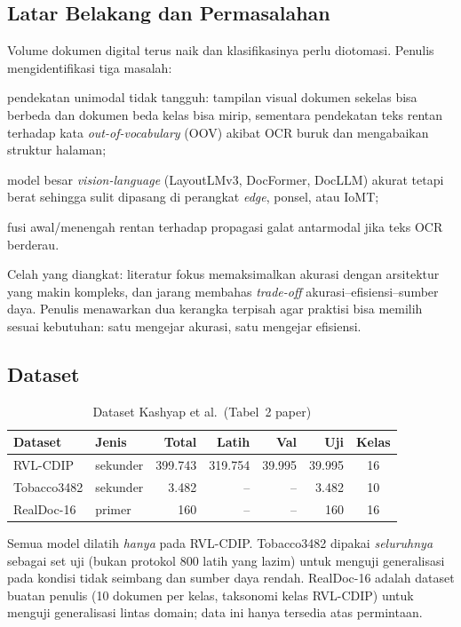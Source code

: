 \subsection{Latar Belakang dan Permasalahan}
Volume dokumen digital terus naik dan klasifikasinya perlu diotomasi. Penulis
mengidentifikasi tiga masalah:
\begin{enumerate*}[label=(\alph*)]
  \item pendekatan unimodal tidak tangguh: tampilan visual dokumen sekelas bisa berbeda dan
        dokumen beda kelas bisa mirip, sementara pendekatan teks rentan terhadap kata
        \emph{out-of-vocabulary} (OOV) akibat OCR buruk dan mengabaikan struktur halaman;
  \item model besar \emph{vision-language} (LayoutLMv3, DocFormer, DocLLM) akurat tetapi
        berat sehingga sulit dipasang di perangkat \emph{edge}, ponsel, atau IoMT;
  \item fusi awal/menengah rentan terhadap propagasi galat antarmodal jika teks OCR
        berderau.
\end{enumerate*}
Celah yang diangkat: literatur fokus memaksimalkan akurasi dengan arsitektur yang makin
kompleks, dan jarang membahas \emph{trade-off} akurasi--efisiensi--sumber daya. Penulis
menawarkan dua kerangka terpisah agar praktisi bisa memilih sesuai kebutuhan: satu
mengejar akurasi, satu mengejar efisiensi.

\subsection{Dataset}
\begin{table}[H]
  \centering
  \caption{Dataset Kashyap et al.\ (Tabel~2 paper)}
  \label{tab:kas-data}
  \fontsize{10}{12}\selectfont
  \begin{tabular}{|l|l|r|r|r|r|c|}
    \hline
    \textbf{Dataset} & \textbf{Jenis} & \textbf{Total} & \textbf{Latih} & \textbf{Val} & \textbf{Uji} & \textbf{Kelas} \\ \hline
    RVL-CDIP    & sekunder & 399.743 & 319.754 & 39.995 & 39.995 & 16 \\ \hline
    Tobacco3482 & sekunder & 3.482   & --      & --     & 3.482  & 10 \\ \hline
    RealDoc-16  & primer   & 160     & --      & --     & 160    & 16 \\ \hline
  \end{tabular}
\end{table}
Semua model dilatih \emph{hanya} pada RVL-CDIP. Tobacco3482 dipakai \emph{seluruhnya}
sebagai set uji (bukan protokol 800 latih yang lazim) untuk menguji generalisasi pada
kondisi tidak seimbang dan sumber daya rendah. RealDoc-16 adalah dataset buatan penulis
(10 dokumen per kelas, taksonomi kelas RVL-CDIP) untuk menguji generalisasi lintas
domain; data ini hanya tersedia atas permintaan.


